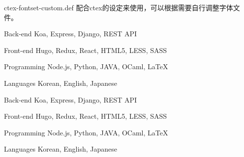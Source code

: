 \begin{cvskills}
\cvskill
{ctex-fontset-custom.def}
{配合ctex的设定来使用，可以根据需要自行调整字体文件。}

\cvskill
{Back-end} %
{Koa, Express, Django, REST API} %

\cvskill
{Front-end} %
{Hugo, Redux, React, HTML5, LESS, SASS} %

\cvskill
{Programming} %
{Node.js, Python, JAVA, OCaml, LaTeX} %

\cvskill
{Languages} %
{Korean, English, Japanese} %

\cvskill
{Back-end} %
{Koa, Express, Django, REST API} %

\cvskill
{Front-end} %
{Hugo, Redux, React, HTML5, LESS, SASS} %

\cvskill
{Programming} %
{Node.js, Python, JAVA, OCaml, LaTeX} %

\cvskill
{Languages} %
{Korean, English, Japanese} %
\end{cvskills}

\clearpage
